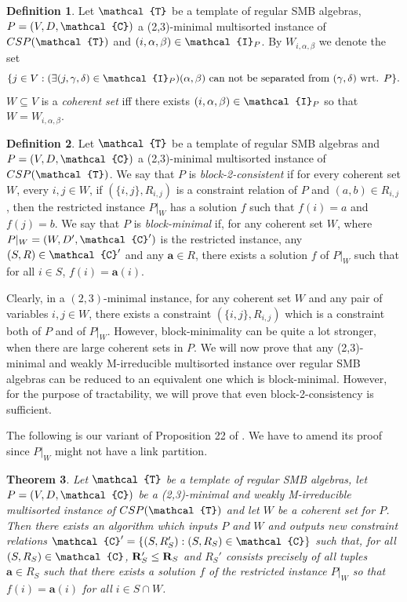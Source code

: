 \documentclass[11pt]{amsart}
\newcommand{\m}[1]{{\uppercase {\mathbf {#1}}}}
\newcommand{\vr}[1]{{\uppercase {\mathcal{#1}}}}
\newtheorem{thm}{Theorem}[section]
\theoremstyle{definition}
\newtheorem{df}[thm]{Definition}
\begin{document}
\begin{df}\label{coherentdef}
Let $\vr t$ be a template of regular SMB algebras, $P=(V,D,\vr c)$ a (2,3)-minimal multisorted instance of $CSP(\vr t)$ and $(i,\alpha,\beta)\in\vr i_P$. By $W_{i,\alpha,\beta}$ we denote the set
\[\{j\in V:(\exists(j,\gamma,\delta)\in \vr i_P)(\alpha,\beta)\text{ can not be separated from }(\gamma,
\delta)\text{ wrt. }P\}.\]
$W\subseteq V$ is a {\em coherent set} iff there exists $(i,\alpha,\beta)\in\vr i_P$ so that $W=W_{i,\alpha,\beta}$.
\end{df}

\begin{df}\label{blockmindef}
Let $\vr t$ be a template of regular SMB algebras and $P=(V,D,\vr c)$ a (2,3)-minimal multisorted instance of $CSP(\vr t)$. We say that $P$ is {\em block-2-consistent} if for every coherent set $W$, every $i,j\in W$, if $(\{i,j\},R_{i,j})$ is a constraint relation of $P$ and $(a,b)\in R_{i,j}$, then the restricted instance $P|_W$ has a solution $f$ such that $f(i)=a$ and $f(j)=b$. We say that $P$ is {\em block-minimal} if, for any coherent set $W$, where $P|_W=(W,D',\vr c')$ is the restricted instance, any $(S,R)\in \vr c'$ and any $\mathbf{a}\in R$, there exists a solution $f$ of $P|_W$ such that for all $i\in S$, $f(i)=\mathbf{a}(i)$.
\end{df}

Clearly, in a $(2,3)$-minimal instance, for any coherent set $W$ and any pair of variables $i,j\in W$, there exists a constraint $(\{i,j\},R_{i,j})$ which is a constraint both of $P$ and of $P|_W$. However, block-minimality can be quite a lot stronger, when there are large coherent sets in $P$. We will now prove that any (2,3)-minimal and weakly M-irreducible multisorted instance over regular SMB algebras can be reduced to an equivalent one which is block-minimal. However, for the purpose of tractability, we will prove that even block-2-consistency is sufficient.

The following is our variant of Proposition 22 of \cite{BuSMB}. We have to amend its proof since $P|_W$ might not have a link partition.

\begin{thm}
Let $\vr t$ be a template of regular SMB algebras, let $P=(V,D,\vr c)$ be a (2,3)-minimal and weakly M-irreducible multisorted instance of $CSP(\vr t)$ and let $W$ be a coherent set for $P$. Then there exists an algorithm which inputs $P$ and $W$ and outputs new constraint relations $\vr c'=\{(S,R_S'):(S,R_S)\in \vr c\}$ such that, for all $(S,R_S)\in\vr c$, $\m r_S'\leq \m r_S$ and $R_S'$ consists precisely of all tuples $\mathbf{a}\in R_S$ such that there exists a solution $f$ of the restricted instance $P|_W$ so that $f(i)=\mathbf{a}(i)$ for all $i\in S\cap W$.
\end{thm}
\end{document}
